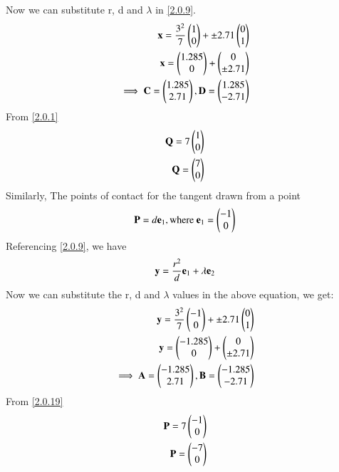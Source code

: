\documentclass[journal,12pt,twocolumn]{IEEEtran}
\begin{document}
\begin{lemma}
 Now we can substitute r, d and $\lambda$ in \eqref{2.0.9}. 
 \begin{align}
    \vec{x}=\frac{3^2}{7}\myvec{1 \\ 0}+\pm 2.71\myvec{0 \\ 1}  
    \\
    \vec{x}=\myvec{1.285 \\ 0}+\myvec{0 \\ \pm 2.71}  
    \\
     \implies\vec{C}=\myvec{1.285 \\ 2.71}, \vec{D}=\myvec{1.285 \\ -2.71}
     \end{align}
 From \eqref{2.0.1}
 \begin{align}
    \vec{Q}=7\myvec{1\\0}
    \\
     \vec{Q}=\myvec{7\\0}
 \end{align}
 Similarly,
 The points of contact for the tangent drawn from a point 
 \begin{align}
     \vec{P}=d\vec{e\textsubscript{1}},
     \text{where }\vec{e\textsubscript{1}}=\myvec{-1\\0} \label{2.0.19}
 \end{align}
Referencing \eqref{2.0.9}, we have
\begin{align}
    \vec{y}=\frac{r^2}{d}\vec{e\textsubscript{1}}+\lambda\vec{e\textsubscript{2}}
\end{align}
Now we can substitute the r, d and $\lambda$ values in the above equation, we get:
\begin{align}
     \vec{y}=\frac{3^2}{7}\myvec{-1 \\ 0}+\pm 2.71\myvec{0 \\ 1}  
    \\
    \vec{y}=\myvec{-1.285 \\ 0}+\myvec{0 \\ \pm 2.71}  
    \\
     \implies\vec{A}=\myvec{-1.285 \\ 2.71}, \vec{B}=\myvec{-1.285 \\ -2.71}
\end{align}
 From \eqref{2.0.19}
 \begin{align}
    \vec{P}=7\myvec{-1\\0}
    \\
     \vec{P}=\myvec{-7\\0}
 \end{align}
 \end{lemma}
\end{document}
